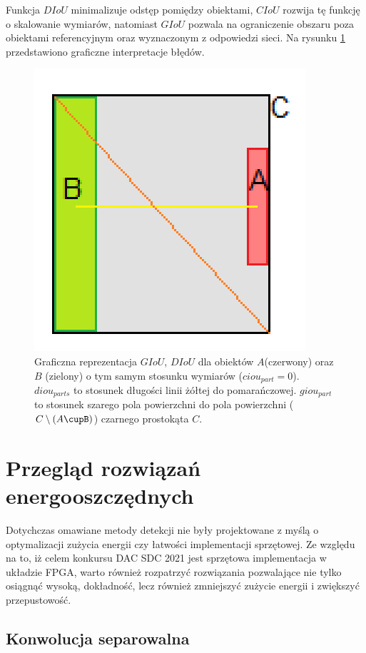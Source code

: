 Funkcja $DIoU$ minimalizuje odstęp pomiędzy obiektami, $CIoU$ rozwija tę funkcję o skalowanie wymiarów, natomiast $GIoU$ pozwala na ograniczenie obszaru poza obiektami referencyjnym oraz wyznaczonym z odpowiedzi sieci.
Na rysunku \ref{fig:iou_losses} przedstawiono graficzne interpretacje błędów.

\begin{figure}
    \centering
     \includegraphics[width=0.4\linewidth]{images/gcdiou.png}
    \caption{ Graficzna reprezentacja $GIoU$, $DIoU$ dla obiektów $A$(czerwony)  oraz $B$ (zielony) o tym samym stosunku wymiarów ($ciou_{part} = 0$). $diou_{parts}$ to stosunek długości linii żółtej do pomarańczowej. $giou_{part}$ to stosunek szarego pola powierzchni do pola powierzchni ($C \setminus (A\cupB)$) czarnego prostokąta $C$.}
    \label{fig:iou_losses}
\end{figure}

\section{Przegląd rozwiązań energooszczędnych}

Dotychczas omawiane metody detekcji nie były projektowane z myślą o optymalizacji zużycia energii czy łatwości implementacji sprzętowej. 
Ze względu na to, iż celem konkursu DAC SDC 2021 jest sprzętowa implementacja w układzie FPGA, warto również rozpatrzyć rozwiązania pozwalające nie tylko osiągnąć wysoką, dokładność, lecz również zmniejszyć zużycie energii i zwiększyć przepustowość.

\subsection{Konwolucja separowalna}
\label{subsec:sep_conv}

